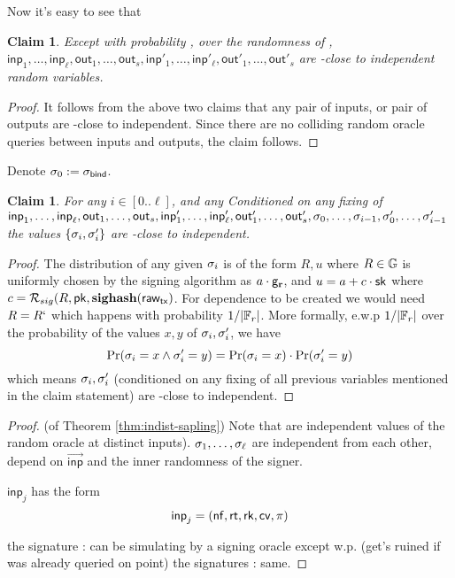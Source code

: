 \documentclass[11pt]{article}
\numberwithin{equation}{section} %
\numberwithin{figure}{section} %
\newtheorem{claim}[thm]{Claim}
\newcommand{\inp}{\ensuremath{\mathsf{inp}}\xspace}
\newcommand{\inps}{\ensuremath{\overrightarrow{\mathsf{inp}}}\xspace}
\newcommand{\out}{\ensuremath{\mathsf{out}}\xspace}
\newcommand{\set}[1]{\ensuremath{\left\{#1\right\}}\xspace}
\begin{document}
Now it's easy to see that
\begin{claim}\label{clm:ind_of_inputs}
Except with probability \negl, over the randomness of \adv,
 $\inp_1,\ldots,\inp_\ell,\out_1,\ldots,\out_s,\inp'_1,\ldots,\inp'_\ell,\out'_1,\ldots,\out'_s$ are \negl-close to independent random variables.
\end{claim}
\begin{proof}
  It follows from the above two claims that any pair of inputs, or pair of outputs are \negl-close to independent.
  Since there are no colliding random oracle queries between inputs and outputs, the claim follows.
\end{proof}


Denote $\sigma_0:= \sigma_{\mathsf{bind}}$.


\begin{claim}\label{clm:ind_of_sigs}
For any $i\in [0..\ell]$, and any 
 Conditioned on any fixing of $\inp_1,\ldots,\inp_\ell,\out_1,\ldots,\out_s,\inp'_1,\ldots,\inp'_\ell,\out'_1,\ldots,\out'_s,\sig_0,\ldots,\sig_{i-1},\sig'_0,\ldots,\sig'_{i-1}$ the values
 $\set{\sig_i,\sig'_i}$ are \negl-close to independent.
\end{claim}
\begin{proof}
 The distribution of any given $\sigma_i$ is of the form $R,u$ where $R\in \mathbb{G}$ is uniformly chosen by the signing algorithm as $a\cdot \mathsf{g}_\mathbf{r}$,
 and $u=a+c\cdot \mathsf{sk}$ where $c=\mathcal R_{sig}(R,\mathsf{pk},\mathbf{sighash}(\mathsf{raw_{tx}})$.
 For dependence to be created we would need $R=R`$ which happens with probability $1/|{\mathbb F}_r|$.
 More formally, e.w.p $1/|{\mathbb F}_r|$ over the probability of the values $x,y$ of $\sigma_i,\sigma'_i$,
 we have 
\[\mathrm{Pr}(\sigma_i=x \wedge \sigma'_i =y)=\mathrm{Pr}(\sigma_i =x)\cdot \mathrm{Pr}(\sigma'_i =y)\]
 which means $\sigma_i,\sigma'_i$ (conditioned on any fixing of all previous variables mentioned in the claim statement) are \negl-close to independent.
 
\end{proof}



\begin{proof} (of Theorem \ref{thm:indist-sapling})
Note that 
are independent values of the random oracle \NF at distinct inputs).
$\sigma_1,\ldots,\sigma_\ell$ are independent from each other, depend on \inps and the inner randomness of the signer.


$\inp_j$ has the form
\[\inp_j = (\nf,\rt,\rk,\cv,\prf)\]

  

the signature \sigval: can be simulating by a signing oracle except w.p. \negl (get's ruined if \RO was already queried on point)
the signatures \sigs: same.
\end{proof}
\end{document}
